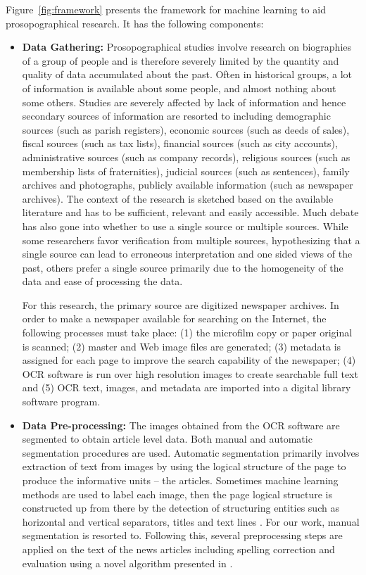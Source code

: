 Figure~\ref{fig:framework} presents the framework for machine learning to aid prosopographical research. It has the following components:

\begin{itemize}
\item \textbf{Data Gathering: } Prosopographical studies involve research on biographies of a group of people and is therefore severely limited by the quantity and quality of data accumulated about the past. Often in historical groups, a lot of information is available about some people, and almost nothing about some others. Studies are severely affected by lack of information and hence secondary sources of information are resorted to including demographic sources (such as parish registers), economic sources (such as deeds of sales), fiscal sources (such as tax lists), financial sources (such as city accounts), administrative sources (such as company records), religious sources (such as membership lists of fraternities), judicial sources (such as sentences), family archives and photographs, publicly available information (such as newspaper archives). The context of the research is sketched based on the available literature and has to be sufficient, relevant and easily accessible. Much debate has also gone into whether to use a single source or multiple sources. While some researchers favor verification from multiple sources, hypothesizing that a single source can lead to erroneous interpretation and one sided views of the past, others prefer a single source primarily due to the homogeneity of the data and ease of processing the data. 

For this research, the primary source are digitized newspaper archives. In order to make a newspaper available for searching on the Internet,
the following processes \cite{dutta2011learning} must take place: (1) the microfilm copy or
paper original is scanned; (2) master and Web image files are
generated; (3) metadata is assigned for each page to improve the
search capability of the newspaper; (4) OCR software is run over high
resolution images to create searchable full text and (5) OCR text,
images, and metadata are imported into a digital library software
program. 

\item \textbf{Data Pre-processing: } The images obtained from the OCR software are segmented to obtain article level data. Both manual and automatic segmentation procedures are used. Automatic segmentation primarily involves extraction of text from images by using the logical structure of the page to produce the
informative units -- the articles. Sometimes machine learning methods are used to label each image, then the page
logical structure is constructed up from there by the detection of
structuring entities such as horizontal and vertical separators, titles
and text lines \cite{Palfray12}. For our work, manual segmentation is resorted to.
Following this, several preprocessing steps are applied on the text of the news
articles including  spelling correction and evaluation using a novel algorithm presented in \cite{Gupta_14a}.



\end{itemize}
